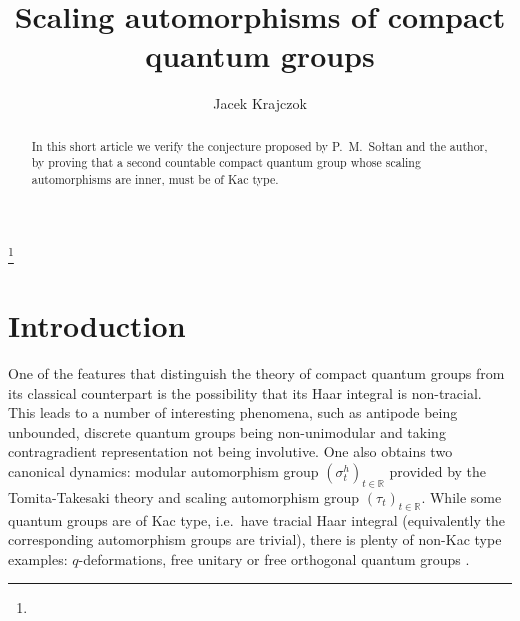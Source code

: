 \documentclass{amsart}
\newcommand{\RR}{\mathbb{R}}
\theoremstyle{definition}
\numberwithin{equation}{section}
\begin{document}
\title{Scaling automorphisms of compact quantum groups}


\author{Jacek Krajczok}
\address{Vrije Universiteit Brussel\\
Pleinlaan 2\\
1050 Brussels\\
Belgium
}

\thanks{}




\date{}

\begin{abstract}
In this short article we verify the conjecture proposed by P.~M.~Sołtan and the author, by proving that a second countable compact quantum group whose scaling automorphisms are inner, must be of Kac type.
\end{abstract}

\maketitle


\section{Introduction}

One of the features that distinguish the theory of compact quantum groups from its classical counterpart is the possibility that its Haar integral is non-tracial. This leads to a number of interesting phenomena, such as antipode being unbounded, discrete quantum groups being non-unimodular and taking contragradient representation not being involutive. One also obtains two canonical dynamics: modular automorphism group $(\sigma^h_t)_{t\in\RR}$ provided by the Tomita-Takesaki theory and scaling automorphism group $(\tau_t)_{t\in\RR}$. While some quantum groups are of Kac type, i.e.~have tracial Haar integral (equivalently the corresponding automorphism groups are trivial), there is plenty of non-Kac type examples: $q$-deformations, free unitary or free orthogonal quantum groups \cite{NeshveyevTuset}.
\end{document}
